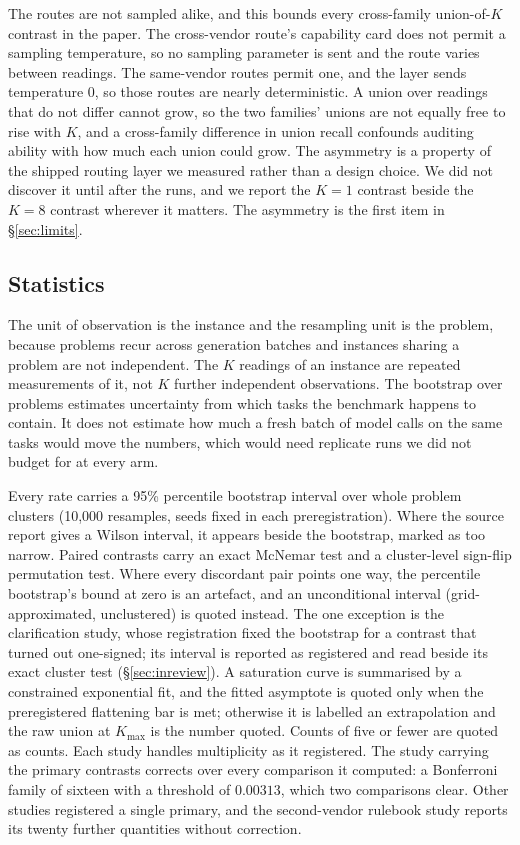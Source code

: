 The routes are not sampled alike, and this bounds every cross-family union-of-$K$
contrast in the paper. The cross-vendor route's capability card does not permit a sampling
temperature, so no sampling parameter is sent and the route varies between readings. The
same-vendor routes permit one, and the layer sends temperature $0$, so those routes are nearly
deterministic. A union over readings that do not differ cannot grow, so the two families' unions
are not equally free to rise with $K$, and a cross-family difference in union recall confounds
auditing ability with how much each union could grow. The asymmetry is a property of the shipped
routing layer we measured rather than a design choice. We did not discover it until after the
runs, and we report the $K=1$ contrast beside the $K=8$ contrast wherever it matters. The
asymmetry is the first item in \S\ref{sec:limits}.

\subsection{Statistics}
\label{sec:stats}

The unit of observation is the instance and the resampling unit is the problem, because problems
recur across generation batches and instances sharing a problem are not independent. The $K$
readings of an instance are repeated measurements of it, not $K$ further independent
observations. The bootstrap over problems estimates uncertainty from which tasks the benchmark
happens to contain. It does not estimate how much a fresh batch of model calls on the same tasks
would move the numbers, which would need replicate runs we did not budget for at every arm.

Every rate carries a 95\% percentile bootstrap interval over whole problem clusters (10{,}000
resamples, seeds fixed in each preregistration). Where the source report gives a Wilson interval,
it appears beside the bootstrap, marked as too narrow. Paired contrasts carry an exact McNemar test and a cluster-level sign-flip permutation
test. Where every discordant pair points one way, the percentile bootstrap's bound at zero is an
artefact, and an unconditional interval (grid-approximated, unclustered) is quoted instead. The
one exception is the clarification study, whose registration fixed the bootstrap for a contrast
that turned out one-signed; its interval is reported as registered and read beside its exact
cluster test (\S\ref{sec:inreview}). A saturation curve is summarised by a constrained
exponential fit, and the fitted asymptote is quoted only when the preregistered flattening bar is
met; otherwise it is labelled an extrapolation and the raw union at $K_{\max}$ is the number
quoted. Counts of five or fewer are quoted as counts. Each study handles multiplicity as it
registered. The study carrying the primary contrasts corrects over every comparison it computed:
a Bonferroni family of sixteen with a threshold of $0.00313$, which two comparisons clear. Other
studies registered a single primary, and the second-vendor rulebook study reports its twenty
further quantities without correction.

